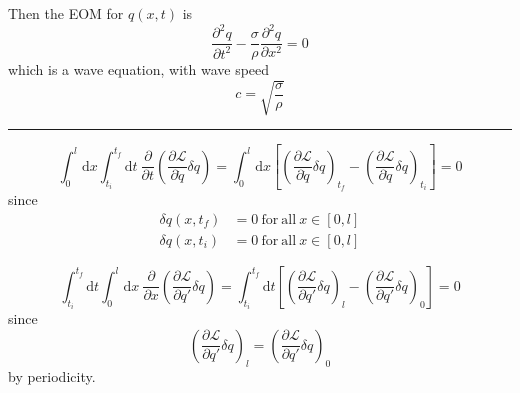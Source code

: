 \documentclass{article}
\begin{document}
\noindent Then the EOM for $q( x, t )$ is
\begin{equation*}
    \dfrac{ \partial^2 q }{ \partial t^2 } - \dfrac{\sigma}{\rho} \dfrac{ \partial^2 q }{ \partial x^2 } = 0
\end{equation*}
which is a wave equation, with wave speed
\begin{equation*}
    c = \sqrt{ \dfrac{\sigma}{\rho} }
\end{equation*}

\noindent\rule{\textwidth}{.5pt}

\begin{equation*}
    \int_0^l \mathrm{d}x \int_{t_i}^{t_f} \mathrm{d}t~ \dfrac{ \partial }{ \partial t } \left( \dfrac{ \partial \mathscr{L} }{ \partial \dot{q} } \delta q \right) = \int_0^l \mathrm{d}x \left[ \left( \dfrac{ \partial \mathscr{L} }{ \partial \dot{q} } \delta q \right)_{t_f} - \left( \dfrac{ \partial \mathscr{L} }{ \partial \dot{q} } \delta q \right)_{t_i} \right] = 0
\end{equation*}
since
\begin{align*}
    \delta q ( x, t_f ) &= 0 \mathrm{~ for ~ all ~} x \in [ 0, l ] \\
    \delta q ( x, t_i ) &= 0 \mathrm{~ for ~ all ~} x \in [ 0, l ]
\end{align*}

\begin{equation*}
    \int_{t_i}^{t_f} \mathrm{d}t \int_0^l \mathrm{d}x~ \dfrac{ \partial }{ \partial x } \left( \dfrac{ \partial \mathscr{L} }{ \partial q' } \delta q \right) = \int_{t_i}^{t_f} \mathrm{d}t \left[ \left( \dfrac{ \partial \mathscr{L} }{ \partial q' } \delta q \right)_l - \left( \dfrac{ \partial \mathscr{L} }{ \partial q' } \delta q \right)_0 \right] = 0
\end{equation*}
since
\begin{equation*}
    \left( \dfrac{ \partial \mathscr{L} }{ \partial q' } \delta q \right)_l = \left( \dfrac{ \partial \mathscr{L} }{ \partial q' } \delta q \right)_0
\end{equation*}
by periodicity.
\end{document}
